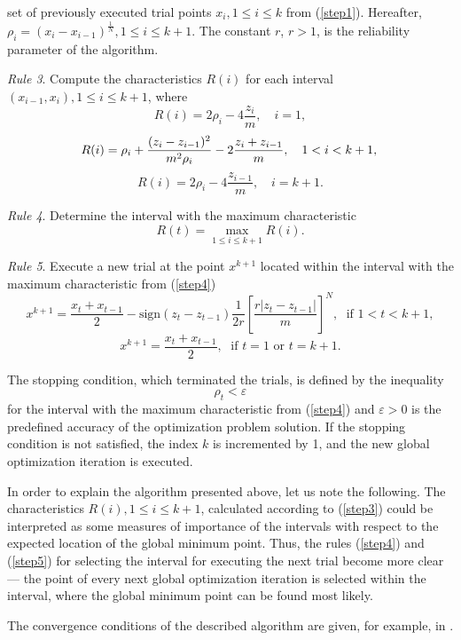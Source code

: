 \documentclass{aims}
\theoremstyle{definition}
\begin{document}
set of previously executed trial points \(x_i,1\leq i\leq k\) from (\ref{step1}).
Hereafter, \(\rho_i=(x_i-x_{i-1})^\frac{1}{N},1\leq i\leq k+1\). The
constant \(r\), \(r>1\), is the reliability parameter of the algorithm.
\par
\textit{Rule 3}. Compute the characteristics \(R(i)\) for each interval \((x_{i-1},x_i),1\leq i\leq k+1\), where
\[
R(i)=2\rho_i-4\frac{z_i}{m},\quad i=1,
\]
\begin{equation} \label{step3}
R(i)=\rho_i+\frac{(z_i-z_{i-1})^2}{m^2\rho_i}-2\frac{z_i+z_{i-1}}{m},\quad 1<i<k+1, \\
\end{equation}
\[
R(i)=2\rho_{i}-4\frac{z_{i-1}}{m},\quad i=k+1.
\]

\par
\textit{Rule 4}. Determine the interval with the maximum characteristic
\begin{equation} \label{step4}
R(t)=\max_{1\leq i \leq k+1}R(i).
\end{equation}
\par
\textit{Rule 5}. Execute a new trial at the point \(x^{k+1}\) located within the interval
with the maximum characteristic from (\ref{step4})
\begin{equation} \label{step5}
  x^{k+1}=\frac{x_t+x_{t-1}}{2}-\mathrm{sign}(z_{t}-z_{t-1})\frac{1}{2r}\left[\frac{r|z_{t}-z_{t-1}|}{m}\right]^N,\; \textrm{ if } 1<t<k+1,
\end{equation}
\[
  x^{k+1}=\frac{x_t+x_{t-1}}{2},\; \textrm{ if } t=1 \textrm{ or } t=k+1.
\]

\par
The stopping condition, which terminated the trials, is defined by the inequality
\begin{equation}
  \label{eq:stop_1}
\rho_t<\varepsilon
\end{equation}
for the interval with the maximum characteristic from (\ref{step4}) and \(\varepsilon >0\) is the predefined
accuracy of the optimization problem solution. If the stopping condition is not satisfied,
the index \(k\) is incremented by 1, and the new global optimization iteration is executed.
\par
In order to explain the algorithm presented above, let us note the following.
The characteristics \(R(i), 1\leq i\leq k+1\), calculated according to (\ref{step3}) could
be interpreted as some measures of importance of the intervals with respect to the
expected location of the global minimum point. Thus, the rules (\ref{step4}) and (\ref{step5}) for selecting
the interval for executing the next trial become more clear --- the point of every next
global optimization iteration is selected within the interval, where the global minimum
point can be found most likely.
\par
The convergence conditions of the described algorithm are given, for example, in \cite{strSergGO}.
\end{document}
